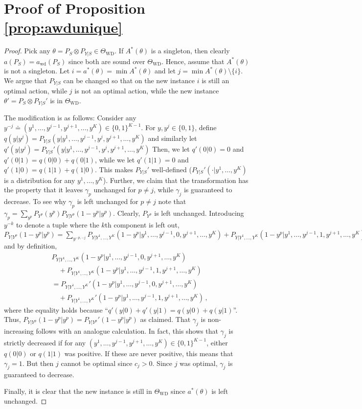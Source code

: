\documentclass[11pt]{article} %
\newcommand{\WD}{\mathrm{WD}}
\newcommand{\TWD}{\Theta_{\WD}}
\newcommand{\awd}{a_{\mathrm{wd}}}
\begin{document}
\section*{Proof of Proposition \ref{prop:awdunique}}
\begin{proof}
	Pick any $\theta = P_S\otimes P_{Y|S}\in \TWD$. If $A^*(\theta)$ is a singleton, then clearly $a(P_S) = \awd(P_S)$ since both are sound over $\TWD$.
	Hence, assume that $A^*(\theta)$ is not a singleton.
	Let $i = a^*(\theta) = \min A^*(\theta)$ and let $j = \min A^*(\theta) \setminus \{ i \}$.
	We argue that $P_{Y|S}$ can be changed so that on the new instance $i$ is still an optimal action, while
	$j$ is not an optimal action, while the new instance $\theta' = P_S \otimes P_{Y|S}'$ is in $\TWD$.
	
	The modification is as follows:
	Consider any $y^{-j} \doteq (y^1,\dots,y^{j-1},y^{j+1},\dots,y^K)\in \{0,1\}^{K-1}$.
	For $y,y^j\in \{0,1\}$, define 
	$q(y|y^j) = P_{Y|S}(y|y^1, \dots, y^{j-1}, y^j, y^{j+1},\dots, y^K)$
	and similarly let
	$q'(y|y^j) = P_{Y|S}'(y|y^1, \dots, y^{j-1}, y^j, y^{j+1},\dots, y^K)$
	Then, we let $q'(0|0) = 0$ and $q'(0|1) = q(0|0) + q(0|1)$,
	while we let  $q'(1|1) = 0$ and $q'(1|0) = q(1|1) + q(1|0)$.
	This makes $P_{Y|S}'$ well-defined ($P_{Y|S}'(\cdot|y^1,\dots,y^K)$ is a distribution for any $y^1,\dots,y^K$).
	Further, we claim that the transformation has the property that 
	it leaves $\gamma_p$ unchanged for $p\ne j$, while $\gamma_j$ is guaranteed to decrease.
	To see why $\gamma_p$ is left unchanged for $p\ne j$ note that
	$\gamma_p = \sum_{y^p}  P_{Y^p}(y^p) P_{Y|Y^p}(1-y^p|y^p)$.
	Clearly, $P_{Y^p}$ is left unchanged.
	Introducing $y^{-k}$ to denote a tuple where the $k$th component is left out,
	$P_{Y|Y^p}(1-y^p|y^p) = \sum_{y^{-p,-j}} P_{Y|Y^1,\dots,Y^K}( 1-y^p | y^1,\dots, y^{j-1}, 0, y^{j+1}, \dots, y^K )
	+P_{Y|Y^1,\dots,Y^K}( 1-y^p | y^1,\dots, y^{j-1}, 1, y^{j+1}, \dots, y^K )$
	and by definition,
	\begin{align*}
	& P_{Y|Y^1,\dots,Y^K}( 1-y^p | y^1,\dots, y^{j-1}, 0, y^{j+1}, \dots, y^K )\\
	&\quad +P_{Y|Y^1,\dots,Y^K}( 1-y^p | y^1,\dots, y^{j-1}, 1, y^{j+1}, \dots, y^K )\\
	&
	=
	P_{Y|Y^1,\dots,Y^K}'( 1-y^p | y^1,\dots, y^{j-1}, 0, y^{j+1}, \dots, y^K )\\
	&\quad+P_{Y|Y^1,\dots,Y^K}'( 1-y^p | y^1,\dots, y^{j-1}, 1, y^{j+1}, \dots, y^K )\,,
	\end{align*}
	where the equality holds because ``$q'(y|0)+q'(y|1) = q(y|0) + q(y|1)$''.
	Thus, $P_{Y|Y^p}(1-y^p|y^p) = P_{Y|Y^p}'(1-y^p|y^p)$ as claimed.
	That $\gamma_j$ is non-increasing follows with an analogue calculation.
	In fact, this shows that $\gamma_j$ is strictly decreased
	if for any $(y^1,\dots,y^{j-1},y^{j+1},\dots,y^K)\in \{0,1\}^{K-1}$, either $q(0|0)$ or $q(1|1)$ was positive.
	If these are never positive, this means that $\gamma_j=1$. 
	But then $j$ cannot be optimal since $c_j>0$.
	Since $j$ was optimal, $\gamma_j$ is guaranteed to decrease.
	
	Finally, it is clear that the new instance is still in $\TWD$ since  $a^*(\theta)$ is left unchanged.
\end{proof}
\end{document}
